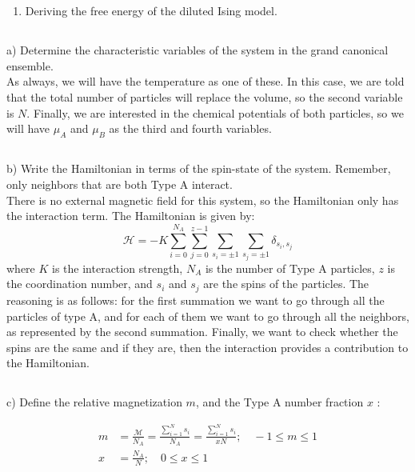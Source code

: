 \documentclass[12pt]{article}
\begin{document}
\section{}
\begin{enumerate}
  \item Deriving the free energy of the diluted Ising model.
\end{enumerate}
\subsection{}
a) Determine the characteristic variables of the system in the grand canonical ensemble.\\
As always, we will have the temperature as one of these. In this case, we are told that the total number of particles will replace the volume, so the second variable is $N$. Finally, we are interested in the chemical potentials of both particles, so we will have $\mu_{A}$ and $\mu_{B}$ as the third and fourth variables.
\subsection{}
b) Write the Hamiltonian in terms of the spin-state of the system. Remember, only neighbors that are both Type A interact.\\
There is no external magnetic field for this system, so the Hamiltonian only has the interaction term. The Hamiltonian is given by:
\begin{equation}
  \mathcal{H}=-K\sum_{i = 0}^{N_{A}} \sum_{j=0}^{z-1} \sum_{s_i = \pm 1} \sum_{s_j = \pm 1}   \delta _{s_{i},s_{j}} \tag{1}
\end{equation}
where $K$ is the interaction strength, $N_{A}$ is the number of Type A particles, $z$ is the coordination number, and $s_{i}$ and $s_{j}$ are the spins of the particles. The reasoning is as follows: for the first summation we want to go through all the particles of type A, and for each of them we want to go through all the neighbors, as represented by the second summation. Finally, we want to check whether the spins are the same and if they are, then the interaction provides a contribution to the Hamiltonian.
\subsection{}
c) Define the relative magnetization $m$, and the Type A number fraction $x$ :


\begin{align*}
m & =\frac{\mathcal{M}}{N_{A}}=\frac{\sum_{i=1}^{N} s_{i}}{N_{A}}=\frac{\sum_{i=1}^{N} s_{i}}{x N} ; \quad-1 \leq m \leq 1  \tag{1}\\
x & =\frac{N_{A}}{N} ; \quad 0 \leq x \leq 1 \tag{2}
\end{align*}
\end{document}
